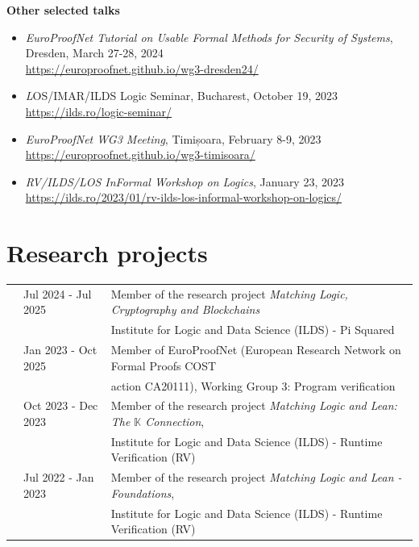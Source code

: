 \documentclass[letterpaper,11pt,oneside]{article}
\begin{document}
\noindent
\large{\textbf{Other selected talks}} 
\normalsize
\begin{itemize}
    \item \emph{EuroProofNet Tutorial on Usable Formal Methods for Security of Systems}, \\
    Dresden, March 27-28, 2024 \\ 
    \url{https://europroofnet.github.io/wg3-dresden24/}
    \item {\emph LOS/IMAR/ILDS Logic Seminar}, Bucharest, October 19, 2023 \\  
    \url{https://ilds.ro/logic-seminar/}
    \item \emph{EuroProofNet WG3 Meeting}, Timișoara, February 8-9, 2023 \\ 
    \url{https://europroofnet.github.io/wg3-timisoara/} 
    \item \emph{RV/ILDS/LOS InFormal Workshop on Logics}, 
    January 23, 2023 \\
    \url{https://ilds.ro/2023/01/rv-ilds-los-informal-workshop-on-logics/}
\end{itemize}
\mbox{} 


\noindent
\section{Research projects}
\normalsize
\begin{tabular}{@{} l l l}
    & Jul 2024 - Jul 2025 & Member of the research project \emph{Matching Logic, Cryptography and Blockchains} \\ 
    &                    & Institute for Logic and Data Science (ILDS) - Pi Squared \\
    & Jan 2023 - Oct 2025 & Member of EuroProofNet (European Research Network on Formal Proofs COST \\
    &                & action CA20111), Working Group 3: Program verification \\
    & Oct 2023 - Dec 2023 & Member of the research project \emph{Matching Logic and Lean: The $\mathbb{K}$ Connection}, \\
    &                    & Institute for Logic and Data Science (ILDS) - Runtime Verification (RV) \\
    & Jul 2022 - Jan 2023 & Member of the research project \emph{Matching Logic and Lean - Foundations}, \\
    &                     & Institute for Logic and Data Science (ILDS) - Runtime Verification (RV)
\end{tabular}
\mbox{}
\end{document}

